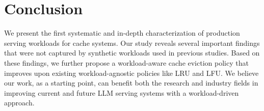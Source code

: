 \section{Conclusion}
\noindent
We present the first systematic and in-depth characterization
of production serving workloads for {\kvcache} cache systems.
Our study reveals several important findings
that were not captured by synthetic workloads used in previous studies.
Based on these findings,
we further propose a workload-aware cache eviction policy
that improves upon existing workload-agnostic policies like LRU and LFU.
We believe our work, as a starting point,
can benefit both the research and industry fields
in improving current and future LLM serving systems with a workload-driven approach.